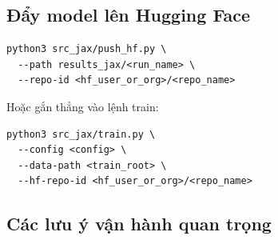 \subsection{Đẩy model lên Hugging Face}

\begin{lstlisting}[style=rae]
python3 src_jax/push_hf.py \
  --path results_jax/<run_name> \
  --repo-id <hf_user_or_org>/<repo_name>
\end{lstlisting}

Hoặc gắn thẳng vào lệnh train:

\begin{lstlisting}[style=rae]
python3 src_jax/train.py \
  --config <config> \
  --data-path <train_root> \
  --hf-repo-id <hf_user_or_org>/<repo_name>
\end{lstlisting}

\subsection{Các lưu ý vận hành quan trọng}

